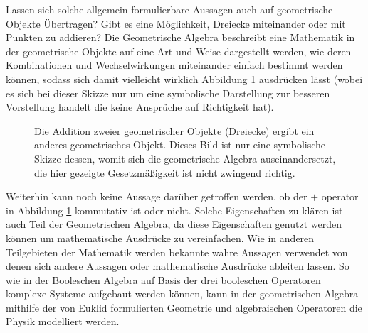Lassen sich solche allgemein formulierbare Aussagen auch auf geometrische Objekte Übertragen? Gibt es eine Möglichkeit, Dreiecke miteinander oder mit Punkten zu addieren? Die Geometrische Algebra beschreibt eine Mathematik in der geometrische Objekte auf eine Art und Weise dargestellt werden, wie deren Kombinationen und Wechselwirkungen miteinander einfach bestimmt werden können, sodass sich damit vielleicht wirklich Abbildung \ref{fig:addition-dreiecke} ausdrücken lässt (wobei es sich bei dieser Skizze nur um eine symbolische Darstellung zur besseren Vorstellung handelt die keine Ansprüche auf Richtigkeit hat).

\begin{figure}
	\centering
	\caption{Die Addition zweier geometrischer Objekte (Dreiecke) ergibt ein anderes geometrisches Objekt. Dieses Bild ist nur eine symbolische Skizze dessen, womit sich die geometrische Algebra auseinandersetzt, die hier gezeigte Gesetzmäßigkeit ist nicht zwingend richtig.}
	\label{fig:addition-dreiecke}
\end{figure}
Weiterhin kann noch keine Aussage darüber getroffen werden, ob der $+$ operator in Abbildung \ref{fig:addition-dreiecke} kommutativ ist oder nicht. Solche Eigenschaften zu klären ist auch Teil der Geometrischen Algebra, da diese Eigenschaften genutzt werden können um mathematische Ausdrücke zu vereinfachen. Wie in anderen Teilgebieten der Mathematik werden bekannte wahre Aussagen verwendet von denen sich andere Aussagen oder mathematische Ausdrücke ableiten lassen. So wie in der Booleschen Algebra auf Basis der drei booleschen Operatoren komplexe Systeme aufgebaut werden können, kann in der geometrischen Algebra mithilfe der von Euklid formulierten Geometrie und algebraischen Operatoren die Physik modelliert werden.
